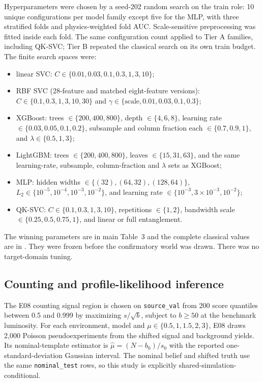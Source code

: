 \documentclass[11pt,a4paper]{article}
\begin{document}
Hyperparameters were chosen by a seed-202 random search on the train role:
10 unique configurations per model family except five for the MLP, with three
stratified folds and physics-weighted fold AUC. Scale-sensitive preprocessing
was fitted inside each fold. The same configuration count applied to Tier A
families, including QK-SVC; Tier B repeated the classical search on its own
train budget. The finite search spaces were:

\begin{itemize}
\item linear SVC: $C\in\{0.01,0.03,0.1,0.3,1,3,10\}$;
\item RBF SVC (28-feature and matched eight-feature versions):
  \newline $C\in\{0.1,0.3,1,3,10,30\}$ and
  $\gamma\in\{\text{scale},0.01,0.03,0.1,0.3\}$;
\item XGBoost: trees $\in\{200,400,800\}$, depth $\in\{4,6,8\}$,
  learning rate $\in\{0.03,0.05,0.1,0.2\}$, subsample and column fraction
  each $\in\{0.7,0.9,1\}$, and $\lambda\in\{0.5,1,3\}$;
\item LightGBM: trees $\in\{200,400,800\}$, leaves
  $\in\{15,31,63\}$, and the same learning-rate, subsample,
  column-fraction and $\lambda$ sets as XGBoost;
\item MLP: hidden widths $\in\{(32),(64,32),(128,64)\}$,
  $L_2\in\{10^{-5},10^{-4},10^{-3},10^{-2}\}$, and learning rate
  $\in\{10^{-3},3\times10^{-3},10^{-2}\}$;
\item QK-SVC: $C\in\{0.1,0.3,1,3,10\}$, repetitions
  $\in\{1,2\}$, bandwidth scale $\in\{0.25,0.5,0.75,1\}$, and linear or
  full entanglement.
\end{itemize}

The winning parameters are in main Table~3 and the complete classical values
are in . They were frozen before
the confirmatory world was drawn. There was no target-domain tuning.

\subsection{Counting and profile-likelihood inference}

The E08 counting signal region is chosen on \texttt{source\_val} from 200 score
quantiles between 0.5 and 0.999 by maximizing $s/\sqrt b$, subject to
$b\geq50$ at the benchmark luminosity. For each environment, model and
$\mu\in\{0.5,1,1.5,2,3\}$, E08 draws 2,000 Poisson pseudoexperiments from the
shifted signal and background yields. Its nominal-template estimator is
$\hat\mu=(N-b_0)/s_0$ with the reported one-standard-deviation Gaussian
interval. The nominal belief and shifted truth use the same
\texttt{nominal\_test} rows, so this study is explicitly
shared-simulation-conditional.
\end{document}
